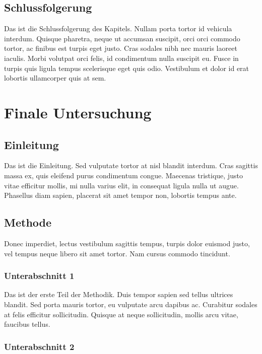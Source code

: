 \documentclass[listof=totoc,index=totoc,bibliography=totoc,12pt,german,a4paper,]{report}
\begin{document}
\section{Schlussfolgerung}\label{schlussfolgerung-2}

Das ist die Schlussfolgerung des Kapitels. Nullam porta tortor id
vehicula interdum. Quisque pharetra, neque ut accumsan suscipit, orci
orci commodo tortor, ac finibus est turpis eget justo. Cras sodales nibh
nec mauris laoreet iaculis. Morbi volutpat orci felis, id condimentum
nulla suscipit eu. Fusce in turpis quis ligula tempus scelerisque eget
quis odio. Vestibulum et dolor id erat lobortis ullamcorper quis at sem.

\chapter{Finale Untersuchung}\label{sec:research-final}

\section{Einleitung}\label{einleitung-4}

Das ist die Einleitung. Sed vulputate tortor at nisl blandit interdum.
Cras sagittis massa ex, quis eleifend purus condimentum congue. Maecenas
tristique, justo vitae efficitur mollis, mi nulla varius elit, in
consequat ligula nulla ut augue. Phasellus diam sapien, placerat sit
amet tempor non, lobortis tempus ante.

\section{Methode}\label{methode-3}

Donec imperdiet, lectus vestibulum sagittis tempus, turpis dolor euismod
justo, vel tempus neque libero sit amet tortor. Nam cursus commodo
tincidunt.

\subsection{Unterabschnitt 1}\label{unterabschnitt-1-2}

Das ist der erste Teil der Methodik. Duis tempor sapien sed tellus
ultrices blandit. Sed porta mauris tortor, eu vulputate arcu dapibus ac.
Curabitur sodales at felis efficitur sollicitudin. Quisque at neque
sollicitudin, mollis arcu vitae, faucibus tellus.

\subsection{Unterabschnitt 2}\label{unterabschnitt-2-3}
\end{document}
